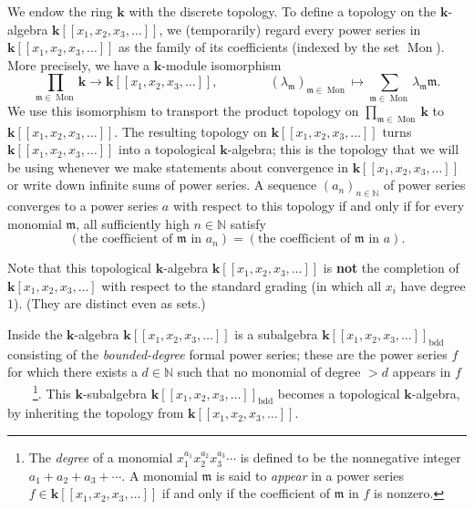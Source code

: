 \documentclass[12pt]{article}
\theoremstyle{plain}
\theoremstyle{definition}
\theoremstyle{remark}
\let\sumnonlimits\sum
\let\prodnonlimits\prod
\renewcommand{\sum}{\sumnonlimits\limits}
\renewcommand{\prod}{\prodnonlimits\limits}
\newcommand{\kk}{{\mathbf{k}}}
\newcommand{\Powser}{\mathbf{k}\left[\left[x_1,x_2,x_3,\ldots\right]\right]}
\newcommand{\bdd}{\operatorname{bdd}}
\newcommand{\NN}{{\mathbb{N}}}
\begin{document}
{We endow the ring $\mathbf{k}$ with the discrete topology. To define a
topology on the $\mathbf{k}$-algebra $\Powser$, we (temporarily) regard every power
series in $\Powser$ as the family of its coefficients (indexed by the
set $\operatorname{Mon}$). More precisely, we have a
$\kk$-module isomorphism
\[
\prod_{\mathfrak{m} \in \operatorname{Mon}} \kk \to \Powser,
\qquad \qquad \left(\lambda_{\mathfrak{m}}\right)_{\mathfrak{m} \in \operatorname{Mon}}
\mapsto \sum_{\mathfrak{m} \in \operatorname{Mon}} \lambda_{\mathfrak{m}} \mathfrak{m} .
\]
We use this isomorphism to transport the product topology on
$\prod_{\mathfrak{m} \in \operatorname{Mon}} \kk$ to $\Powser$. The
resulting topology on $\Powser$ turns $\Powser$ into a topological
$\kk$-algebra; this is the topology that we will
be using whenever we make statements about convergence in $\Powser$
or write down infinite sums of power series.
A sequence $\left( a_n \right)_{n \in \NN}$ of power series converges
to a power series $a$ with respect to this topology if
and only if for every monomial $\mathfrak{m}$, all sufficiently high
$n \in \NN$ satisfy
\[
\left(  \text{the coefficient of } \mathfrak{m}\text{ in }a_{n}\right)
=\left(  \text{the coefficient of } \mathfrak{m}\text{ in }a\right)  .
\]

Note that this topological $\kk$-algebra $\Powser$ is \textbf{not}
the completion of $\mathbf{k}\left[  x_{1},x_{2},x_{3},\ldots\right]$
with respect to the standard grading (in which all $x_{i}$ have degree $1$).
(They are distinct even as sets.)
}

Inside the $\kk$-algebra $\Powser$ is a
subalgebra $\Powser_{\bdd}$ consisting of the \textit{bounded-degree}
formal power series; these are the power series $f$ for which there
exists a $d \in \NN$ such that no monomial of degree $> d$ appears in
$f$\ \ \ \ \footnote{The \textit{degree} of a monomial
$x_1^{a_1} x_2^{a_2} x_3^{a_3} \cdots$ is defined to be the nonnegative
integer $a_1 + a_2 + a_3 + \cdots$. A monomial $\mathfrak{m}$ is said
to \textit{appear} in a power series $f \in \Powser$ if and only if
the coefficient of $\mathfrak{m}$ in $f$ is nonzero.}.
This $\kk$-subalgebra $\Powser_{\bdd}$ becomes a topological
$\kk$-algebra, by inheriting the topology from $\Powser$.
\end{document}
